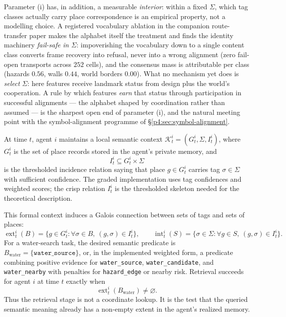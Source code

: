 \documentclass{article}
\begin{document}
Parameter (i) has, in addition, a measurable \emph{interior}: within a
fixed $\Sigma$, which tag classes actually carry place correspondence
is an empirical property, not a modelling choice. A registered
vocabulary ablation in the companion route-transfer paper makes the
alphabet itself the treatment and finds the identity machinery
\emph{fail-safe in $\Sigma$}: impoverishing the vocabulary down to a
single content class converts frame recovery into refusal, never into
a wrong alignment (zero fail-open transports across $252$ cells), and
the consensus mass is attributable per class (hazards $0.56$, walls
$0.44$, world borders $0.00$). What no mechanism yet does is
\emph{select} $\Sigma$: here features receive landmark status from
design plus the world's cooperation. A rule by which features
\emph{earn} that status through participation in successful alignments
--- the alphabet shaped by coordination rather than assumed --- is the
sharpest open end of parameter (i), and the natural meeting point with
the symbol-alignment programme of \S\ref{p4:sec:symbol-alignment}.

At time $t$, agent $i$ maintains a local semantic context
$\mathcal{K}_t^i=(G_t^i,\Sigma,I_t^i)$, where $G_t^i$ is the set of
place records stored in the agent's private memory, and
\[
I_t^i \subseteq G_t^i \times \Sigma
\]
is the thresholded incidence relation saying that place $g\in G_t^i$
carries tag $\sigma\in\Sigma$ with sufficient confidence. The graded
implementation uses tag confidences and weighted scores; the crisp
relation $I_t^i$ is the thresholded skeleton needed for the theoretical
description.

This formal context induces a Galois connection between sets of tags
and sets of places:
\[
\operatorname{ext}_t^i(B)=\{g\in G_t^i:\forall\sigma\in B,\ (g,\sigma)\in I_t^i\},
\qquad
\operatorname{int}_t^i(S)=\{\sigma\in\Sigma:\forall g\in S,\ (g,\sigma)\in I_t^i\}.
\]
For a water-search task, the desired semantic predicate is
$B_{\mathrm{water}}=\{\texttt{water\_source}\}$, or, in the implemented
weighted form, a predicate combining positive evidence for
\texttt{water\_source}, \texttt{water\_candidate}, and
\texttt{water\_nearby} with penalties for \texttt{hazard\_edge} or
nearby risk. Retrieval succeeds for agent $i$ at time $t$ exactly when
\[
\operatorname{ext}_t^i(B_{\mathrm{water}})\neq\varnothing .
\]
Thus the retrieval stage is not a coordinate lookup. It is the test
that the queried semantic meaning already has a non-empty extent in the
agent's realized memory.
\end{document}
